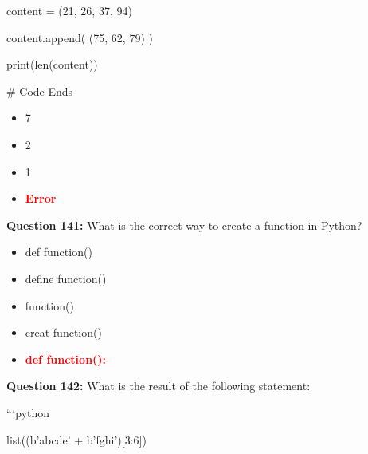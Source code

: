 \documentclass[12pt,a4paper]{article}
\begin{document}
\newline
content = (21, 26, 37, 94)\newline

\newline
content.append( (75, 62, 79) )\newline

\newline
print(len(content))\newline

\newline
\newline

\newline
# Code Ends

\begin{itemize}
    \item[\textbf{A.}] 7
    \item[\textbf{B.}] 2
    \item[\textbf{C.}] 1
    \item[\textbf{D.}] \textcolor{red}{\textbf{Error}}
\end{itemize}

\vspace{0.5cm}

\textbf{Question 141:} What is the correct way to create a function in Python?

\begin{itemize}
    \item[\textbf{A.}] def function()
    \item[\textbf{B.}] define function()
    \item[\textbf{C.}] function()
    \item[\textbf{D.}] creat function()
    \item[\textbf{E.}] \textcolor{red}{\textbf{def function():}}
\end{itemize}

\vspace{0.5cm}

\textbf{Question 142:} What is the result of the following statement:\newline

\newline
\newline

\newline
```python\newline

\newline
list((b'abcde' + b'fghi')[3:6])\newline
\end{document}
